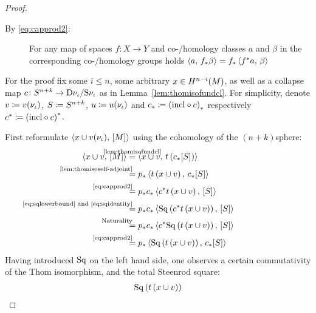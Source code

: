 \begin{Thm}
\begin{proof}
\begin{description}
    \item[By \eqref{eq:capprod2}:]
      For any map of spaces $f\colon X\to Y$ and co-/homology classes
      $a$ and $\beta$ in the corresponding co-/homology groups holds
      $\left\langle a,\, {f}_* \beta \right\rangle = {f}_* \left\langle {f}^* a,\, \beta \right\rangle$
    \end{description}
    For the proof fix some $i\leq n$, some arbitrary $x\in
    H^{n-i}(M)$, as well as a collapse map
    $c\colon S^{n+k}\to\mathrm{D}\nu_{{\iota}}/\mathrm{S}\nu_{{\iota}}$
    as in Lemma~\ref{lem:thomisofundcl}.
    For simplicity, denote
    $v\coloneqq {v}(\nu_{{\iota}})$,
    $S\coloneqq S^{n+k}$,
    $u\coloneqq {u}(\nu_{{\iota}})$ and
    ${c}_*\coloneqq {(\mathrm{incl}\circ c)}_*$
    respectively
    ${c}^*\coloneqq {(\mathrm{incl}\circ c)}^*$.
    
    First reformulate
    $\left\langle x\cup {v}(\nu_{{\iota}}),\, [M] \right\rangle$ using the cohomology of the
    $(n+k)$\nbd{}sphere:
    \begin{align}\notag
      \capped{x\cup \Vu}{\fundcl M}
      &\clapequalsby{\ref{lem:thomisofundcl}}
        \capped
        {x\cup\Vu}
        {\thomiso\left(\pf\collapse\fundcl{\Sph}\right)}
      \\\notag
      &\equalsby{\ref{lem:thomisoself-adjoint}}
        \pf p\capped
        {\thomiso\left(x\cup\Vu\right)}
        {\pf\collapse\fundcl{\Sph}}
      \\\notag
      &\equalsby{\eqref{eq:capprod2}}
        \pf p\pf\collapse\capped
        {\pb\collapse\thomiso\left(x\cup\Vu\right)}
        {\fundcl{\Sph}}
      \\\notag
      &\equalsby{\eqref{eq:sqlowerbound} and \eqref{eq:sqidentity}}
        \pf p\pf\collapse\capped
        {\SQ\left(\pb\collapse\thomiso\left(x\cup\Vu\right)\right)}
        {\fundcl{\Sph}}
      \\\notag
      &\equalsby{Naturality}
        \pf p\pf\collapse\capped
        {\pb\collapse\SQ\left(\thomiso\left(x\cup\Vu\right)\right)}
        {\fundcl{\Sph}}
      \\\label{eq:proofaltdefwuclasses:eq1}
      &\equalsby{\eqref{eq:capprod2}}
        \pf p\capped
        {\SQ\left(\thomiso\left(x\cup\Vu\right)\right)}
        {\pf\collapse\fundcl{\Sph}}
    \end{align}
    Having introduced $\mathrm{Sq}$ on the left hand side, one observes a
    certain commutativity of the Thom isomorphism, and the total
    Steenrod square:
    \begin{align}\notag
      \SQ\left(\thomiso\left(x\cup\Vu\right)\right)

\end{align}
\end{proof}
\end{Thm}
